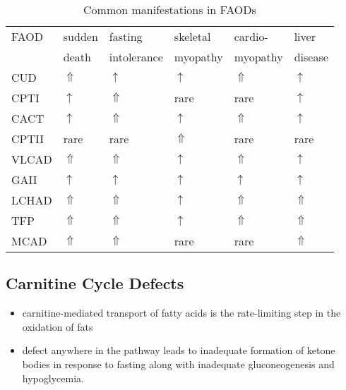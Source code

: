 \documentclass{scrartcl}
\begin{document}
\begin{table}[htbp]
\caption{\label{tab:org406a6e8}Common manifestations in FAODs}
\centering
\begin{tabular}{llllll}
FAOD & sudden & fasting & skeletal & cardio- & liver\\
 & death & intolerance & myopathy & myopathy & disease\\
\hline
CUD & \(\Uparrow\) & \(\uparrow\) & \(\uparrow\) & \(\Uparrow\) & \(\uparrow\)\\
CPTI & \(\uparrow\) & \(\Uparrow\) & rare & rare & \(\uparrow\)\\
CACT & \(\uparrow\) & \(\Uparrow\) & \(\uparrow\) & \(\Uparrow\) & \(\uparrow\)\\
CPTII & rare & rare & \(\Uparrow\) & rare & rare\\
VLCAD & \(\Uparrow\) & \(\Uparrow\) & \(\uparrow\) & \(\Uparrow\) & \(\uparrow\)\\
GAII & \(\uparrow\) & \(\uparrow\) & \(\uparrow\) & \(\uparrow\) & \(\uparrow\)\\
LCHAD & \(\Uparrow\) & \(\Uparrow\) & \(\uparrow\) & \(\Uparrow\) & \(\Uparrow\)\\
TFP & \(\Uparrow\) & \(\Uparrow\) & \(\uparrow\) & \(\Uparrow\) & \(\Uparrow\)\\
MCAD & \(\Uparrow\) & \(\Uparrow\) & rare & rare & \(\Uparrow\)\\
\end{tabular}
\end{table}

\subsection{Carnitine Cycle Defects}
\label{sec:orgea85044}
\begin{itemize}
\item carnitine-mediated transport of fatty acids is the rate-limiting
step in the oxidation of fats
\item defect anywhere in the pathway leads to inadequate formation of
ketone bodies in response to fasting along with inadequate
gluconeogenesis and hypoglycemia.
\end{itemize}
\end{document}
